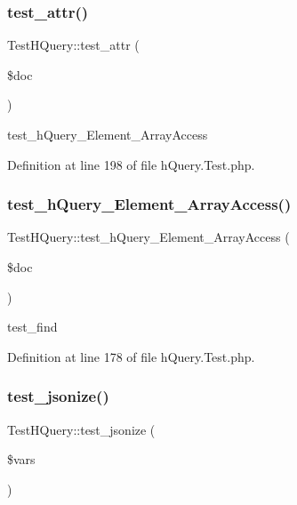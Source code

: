 \subsubsection{\texorpdfstring{test\+\_\+attr()}{test\_attr()}}
{\footnotesize\ttfamily Test\+H\+Query\+::test\+\_\+attr (\begin{DoxyParamCaption}\item[{}]{\$doc }\end{DoxyParamCaption})}

test\+\_\+h\+Query\+\_\+\+Element\+\_\+\+Array\+Access 

Definition at line 198 of file h\+Query.\+Test.\+php.

\mbox{\label{classTestHQuery_a54c617e0c89afdbe81d7a8cbb64eb20d}} 
\subsubsection{\texorpdfstring{test\+\_\+h\+Query\+\_\+\+Element\+\_\+\+Array\+Access()}{test\_hQuery\_Element\_ArrayAccess()}}
{\footnotesize\ttfamily Test\+H\+Query\+::test\+\_\+h\+Query\+\_\+\+Element\+\_\+\+Array\+Access (\begin{DoxyParamCaption}\item[{}]{\$doc }\end{DoxyParamCaption})}

test\+\_\+find 

Definition at line 178 of file h\+Query.\+Test.\+php.

\mbox{\label{classTestHQuery_a0761ef814c63b654b88661198f654038}} 
\subsubsection{\texorpdfstring{test\+\_\+jsonize()}{test\_jsonize()}}
{\footnotesize\ttfamily Test\+H\+Query\+::test\+\_\+jsonize (\begin{DoxyParamCaption}\item[{}]{\$vars }\end{DoxyParamCaption})}

